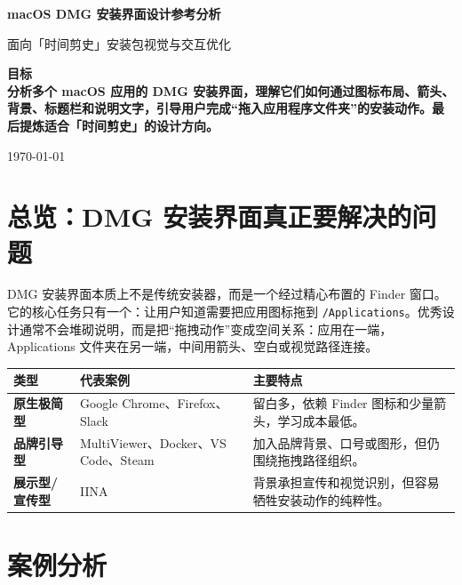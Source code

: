 \documentclass[11pt,a4paper]{article}
\begin{document}
\begin{titlepage}
\centering
\vspace*{22mm}
{\Huge\bfseries macOS DMG 安装界面设计参考分析\par}
\vspace{8mm}
{\Large 面向「时间剪史」安装包视觉与交互优化\par}
\vspace{18mm}
\colorbox{SoftGray}{%
\begin{minipage}{0.78\linewidth}
\vspace{6mm}
\Large\bfseries 目标\\[6pt]
\normalsize
分析多个 macOS 应用的 DMG 安装界面，理解它们如何通过图标布局、箭头、背景、标题栏和说明文字，引导用户完成“拖入应用程序文件夹”的安装动作。最后提炼适合「时间剪史」的设计方向。
\vspace{6mm}
\end{minipage}%
}
\vfill
{\large \today\par}
\end{titlepage}

\tableofcontents
\newpage

\section{总览：DMG 安装界面真正要解决的问题}

DMG 安装界面本质上不是传统安装器，而是一个经过精心布置的 Finder 窗口。它的核心任务只有一个：让用户知道需要把应用图标拖到 \texttt{/Applications}。优秀设计通常不会堆砌说明，而是把“拖拽动作”变成空间关系：应用在一端，Applications 文件夹在另一端，中间用箭头、空白或视觉路径连接。

\begin{table}[htbp]
\centering
\renewcommand{\arraystretch}{1.25}
\begin{tabularx}{\linewidth}{>{\bfseries}l X X}
\toprule
类型 & 代表案例 & 主要特点 \\
\midrule
原生极简型 & Google Chrome、Firefox、Slack & 留白多，依赖 Finder 图标和少量箭头，学习成本最低。 \\
品牌引导型 & MultiViewer、Docker、VS Code、Steam & 加入品牌背景、口号或图形，但仍围绕拖拽路径组织。 \\
展示型/宣传型 & IINA & 背景承担宣传和视觉识别，但容易牺牲安装动作的纯粹性。 \\
\bottomrule
\end{tabularx}
\end{table}

\section{案例分析}
\end{document}

